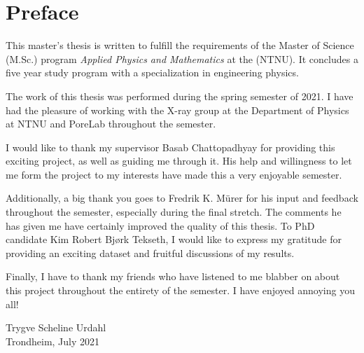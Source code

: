 \chapter*{Preface}
This master's thesis is written to fulfill the requirements of the Master of Science (M.Sc.) program \textit{Applied Physics and Mathematics} at the \NTNU (NTNU). It concludes a five year study program with a specialization in engineering physics. 

The work of this thesis was performed during the spring semester of 2021. I have had the pleasure of working with the X-ray group at the Department of Physics at NTNU and PoreLab throughout the semester. 

I would like to thank my supervisor Basab Chattopadhyay for providing this exciting project, as well as guiding me through it. His help and willingness to let me form the project to my interests have made this a very enjoyable semester.

Additionally, a big thank you goes to Fredrik K. Mürer for his input and feedback throughout the semester, especially during the final stretch. The comments he has given me have certainly improved the quality of this thesis. To PhD candidate Kim Robert Bjørk Tekseth, I would like to express my gratitude for providing an exciting dataset and fruitful discussions of my results. 

Finally, I have to thank my friends who have listened to me blabber on about this project throughout the entirety of the semester. I have enjoyed annoying you all! 

\begin{center}
    Trygve Scheline Urdahl \\[2pt]
    Trondheim, July 2021 
\end{center}